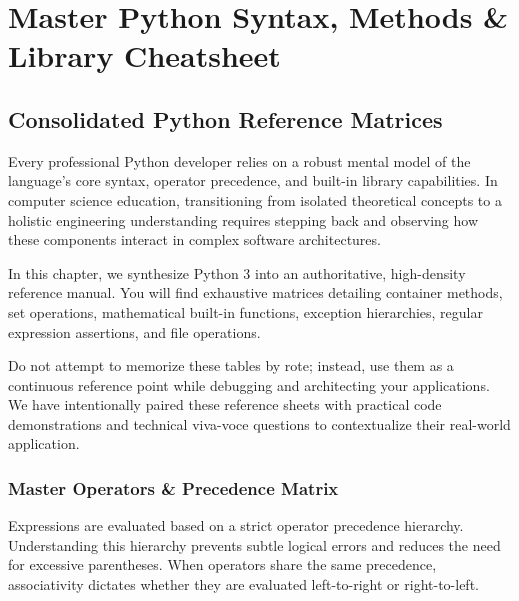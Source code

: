 \chapter{Master Python Syntax, Methods \& Library Cheatsheet}
\label{chap:master-syntax-methods-sheet}

\section{Consolidated Python Reference Matrices}

Every professional Python developer relies on a robust mental model of the language's core syntax, operator precedence, and built-in library capabilities. In computer science education, transitioning from isolated theoretical concepts to a holistic engineering understanding requires stepping back and observing how these components interact in complex software architectures. 

In this chapter, we synthesize Python 3 into an authoritative, high-density reference manual. You will find exhaustive matrices detailing container methods, set operations, mathematical built-in functions, exception hierarchies, regular expression assertions, and file operations. 

Do not attempt to memorize these tables by rote; instead, use them as a continuous reference point while debugging and architecting your applications. We have intentionally paired these reference sheets with practical code demonstrations and technical viva-voce questions to contextualize their real-world application.

\subsection{Master Operators \& Precedence Matrix}

Expressions are evaluated based on a strict operator precedence hierarchy. Understanding this hierarchy prevents subtle logical errors and reduces the need for excessive parentheses. When operators share the same precedence, associativity dictates whether they are evaluated left-to-right or right-to-left. \lpuBadge

